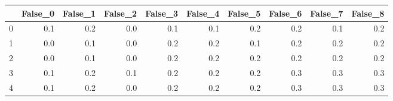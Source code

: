 \begin{tabular}{lrrrrrrrrr}
\toprule
{} &  False\_0 &  False\_1 &  False\_2 &  False\_3 &  False\_4 &  False\_5 &  False\_6 &  False\_7 &  False\_8 \\ \hline
\midrule
0 &      0.1 &      0.2 &      0.0 &      0.1 &      0.1 &      0.2 &      0.2 &      0.1 &      0.2 \\ \hline
1 &      0.0 &      0.1 &      0.0 &      0.2 &      0.2 &      0.1 &      0.2 &      0.2 &      0.2 \\ \hline
2 &      0.0 &      0.1 &      0.0 &      0.2 &      0.2 &      0.2 &      0.2 &      0.2 &      0.2 \\ \hline
3 &      0.1 &      0.2 &      0.1 &      0.2 &      0.2 &      0.2 &      0.3 &      0.3 &      0.3 \\ \hline
4 &      0.1 &      0.2 &      0.0 &      0.2 &      0.2 &      0.2 &      0.3 &      0.3 &      0.3 \\ \hline
\bottomrule
\end{tabular}

